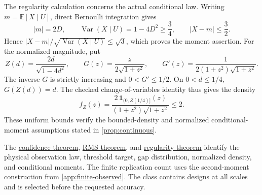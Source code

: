 The regularity calculation concerns the actual conditional law.
Writing $m=\mathbb E[X\mid U]$, direct Bernoulli integration gives
\[
 |m|=2D,\qquad
 \operatorname{Var}(X\mid U)=1-4D^2\ge\frac34,\qquad
 |X-m|\le\frac32.
\]
Hence $|X-m|/\sqrt{\operatorname{Var}(X\mid U)}\le\sqrt3$,
which proves the moment assertion.
For the normalized magnitude, put
\[
 Z(d)=\frac{2d}{\sqrt{1-4d^2}},\qquad
 G(z)=\frac{z}{2\sqrt{1+z^2}},\qquad
 G'(z)=\frac1{2(1+z^2)\sqrt{1+z^2}}.
\]
The inverse $G$ is strictly increasing and $0<G'\le1/2$.
On $0<d\le1/4$, $G(Z(d))=d$. The checked change-of-variables
identity thus gives the density
\[
 f_Z(z)=
 \frac{2\,\mathbf1_{(0,Z(1/4)]}(z)}
 {(1+z^2)\sqrt{1+z^2}}
 \le2.
\]
These uniform bounds verify the bounded-density and normalized
conditional-moment assumptions stated in \cref{prop:continuous}.

The \href{https://github.com/davidiach/adaptive-threshold-estimation/blob/10fc9a912ff5ecd9b1125bea47daa4821df6fd79/lean/ThresholdHC/ContinuousObserved/UniformLower.lean}{confidence theorem},
\href{https://github.com/davidiach/adaptive-threshold-estimation/blob/10fc9a912ff5ecd9b1125bea47daa4821df6fd79/lean/ThresholdHC/ContinuousObserved/UniformRMSLower.lean}{RMS theorem}, and
\href{https://github.com/davidiach/adaptive-threshold-estimation/blob/10fc9a912ff5ecd9b1125bea47daa4821df6fd79/lean/ThresholdHC/ContinuousObserved/Regularity.lean}{regularity theorem}
identify the physical observation law, threshold target, gap
distribution, normalized density, and conditional moments.
The finite replication count uses the second-moment construction
from \cref{app:finite-observed}. The class contains designs at all
scales and is selected before the requested accuracy.
